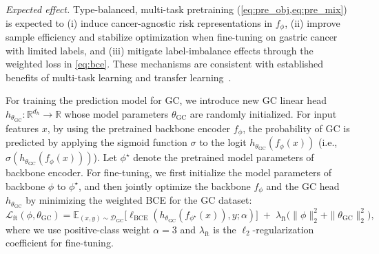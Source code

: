 \documentclass[diagnostics,article,submit,pdftex,moreauthors]{Definitions/mdpi}
\newcommand{\GC}{\mathrm{GC}}
\newcommand{\CC}{\mathrm{CC}}
\newcommand{\EC}{\mathrm{EC}}
\newcommand{\LC}{\mathrm{LC}}
\newcommand{\PC}{\mathrm{PC}}
\newcommand{\encP}{\phi}  %
\newcommand{\enc}[1]{f_{#1}}
\newcommand{\headP}[1]{\theta_{#1}}
\newcommand{\head}[1]{h_{\headP{#1}}}
\newcommand{\pretrainP}{\encP^\star}
\newcommand{\preDecayC}{\lambda_{\mathrm{pre}}}  %
\newcommand{\ftDecayC}{\lambda_{\mathrm{ft}}}  %
\begin{document}
\textit{Expected effect.} Type-balanced, multi-task pretraining (\cref{eq:pre_obj,eq:pre_mix}) is expected to (i) induce cancer-agnostic risk representations in $f_\phi$, (ii) improve sample efficiency and stabilize optimization when fine-tuning on gastric cancer with limited labels, and (iii) mitigate label-imbalance effects through the weighted loss in \cref{eq:bce}.
These mechanisms are consistent with established benefits of multi-task learning and transfer learning~\citep{Caruana1997_MTL,Pan2010_TLsurvey,Yosinski2014_transferable,He2009_Imbalanced}.

For training the prediction model for GC, we introduce new GC linear head $\head{\GC}:\mathbb{R}^{d_{h}}\!\to\!\mathbb{R}$ whose model parameters $\headP{\GC}$ are randomly initialized.
For input features $x$, by using the pretrained backbone encoder $\enc{\encP}$, the probability of GC is predicted by applying the sigmoid function $\sigma$ to the logit $\head{\GC}(\enc{\encP}(x))$ (i.e., $\sigma(\head{\GC}(\enc{\encP}(x)))$).
Let $\pretrainP$ denote the pretrained model parameters of backbone encoder.
For fine-tuning, we first initialize the model parameters of backbone $\encP$ to $\pretrainP$, and then jointly optimize the backbone $\enc{\encP}$ and the GC head $\head{\GC}$ by minimizing the weighted BCE for the GC dataset:
\begin{equation}
\label{eq:ft_obj}
\mathcal{L}_{\mathrm{ft}}(\phi,\headP{\GC}) = \mathbb{E}_{(x,y)\sim \mathcal{D}_{\GC}}\!\big[\ell_{\mathrm{BCE}}(\head{\GC}(\enc{\pretrainP}(x)),y;\alpha)\big]\;+\;\ftDecayC \big( \|\phi\|_2^2 + \|\headP{\GC}\|_2^2 \big),
\end{equation}
where we use positive-class weight $\alpha{=}3$ and $\ftDecayC$ is the $\ell_2$-regularization coefficient for fine-tuning.


\end{document}
